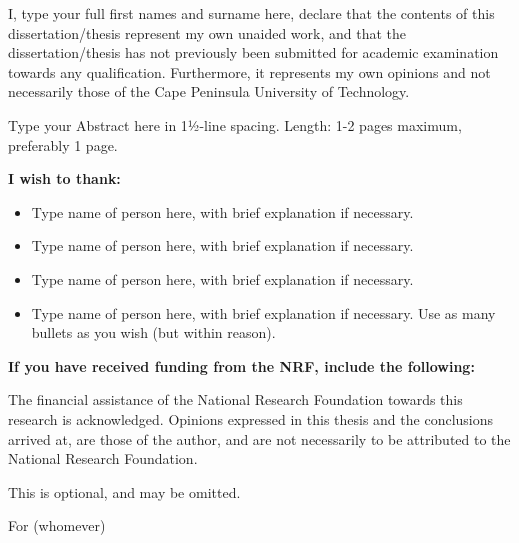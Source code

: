 \documentclass{cputthesis}
\begin{document}
\maketitle

\frontmatter

\begin{declaration}
I, type your full first names and surname here, declare that the contents of this dissertation/thesis represent my own unaided work, and that the dissertation/thesis has not previously been submitted for academic examination towards any qualification. Furthermore, it represents my own opinions and not necessarily those of the Cape Peninsula University of Technology.
\end{declaration}

\begin{cputabstract}
Type your Abstract here in 1½-line spacing. Length: 1-2 pages maximum, preferably 1 page.
\end{cputabstract}

\begin{acknowledgements}
\textbf{I wish to thank:}

\begin{itemize}
\item Type name of person here, with brief explanation if necessary.
\item Type name of person here, with brief explanation if necessary.
\item Type name of person here, with brief explanation if necessary.
\item Type name of person here, with brief explanation if necessary. Use as many bullets as you wish (but within reason).
\end{itemize}

\textbf{If you have received funding from the NRF, include the following:}

The financial assistance of the National Research Foundation towards this research is acknowledged. Opinions expressed in this thesis and the conclusions arrived at, are those of the author, and are not necessarily to be attributed to the National Research Foundation.
\end{acknowledgements}

\begin{dedication}
This is optional, and may be omitted.

\vspace{1cm}

For (whomever)
\end{dedication}
\end{document}
